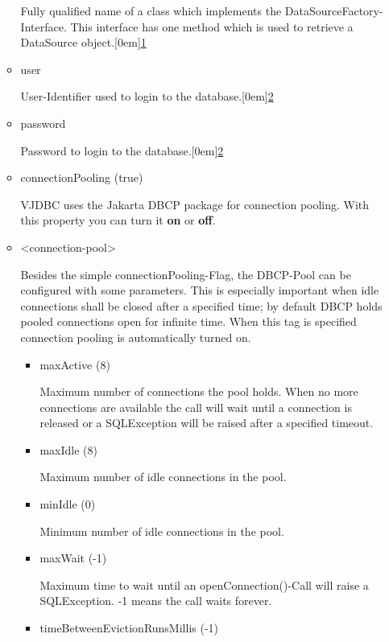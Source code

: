 \documentclass[10pt,a4paper,english]{article}
\begin{document}
\begin{itemize}
\begin{itemize}
Fully qualified name of a class which implements the DataSourceFactory-Interface. This interface has one method which is used to retrieve a DataSource object.\raisebox{.5em}[0em]{\scriptsize\hyperlink{id7}{1}}

\item {} 
user

User-Identifier used to login to the database.\raisebox{.5em}[0em]{\scriptsize\hyperlink{id8}{2}}

\item {} 
password

Password to login to the database.\raisebox{.5em}[0em]{\scriptsize\hyperlink{id8}{2}}

\item {} 
connectionPooling (true)

VJDBC uses the Jakarta DBCP package for connection pooling. With this property you can turn it \textbf{on} or \textbf{off}.

\item {} 
{\textless}connection-pool{\textgreater}

Besides the simple connectionPooling-Flag, the DBCP-Pool can be configured with some parameters. This is especially important when idle connections shall be closed after a specified time; by default DBCP holds pooled connections open for infinite time. When this tag is specified connection pooling is automatically turned on.
\begin{itemize}
\item {} 
maxActive (8)

Maximum number of connections the pool holds. When no more connections are available the call will wait until a connection is released or a SQLException will be raised after a specified timeout.

\item {} 
maxIdle (8)

Maximum number of idle connections in the pool.

\item {} 
minIdle (0)

Minimum number of idle connections in the pool.

\item {} 
maxWait (-1)

Maximum time to wait until an openConnection()-Call will raise a SQLException. -1 means the call waits forever.

\item {} 
timeBetweenEvictionRunsMillis (-1)


\end{itemize}
\end{itemize}
\end{itemize}
\end{document}
